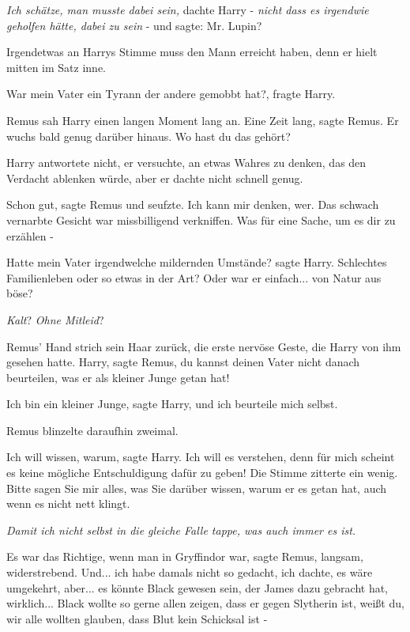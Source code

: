 \emph{Ich schätze, man musste dabei sein,} dachte Harry - \emph{nicht dass es
irgendwie geholfen hätte, dabei zu sein} - und sagte: \glqq{}Mr. Lupin?\grqq{}

Irgendetwas an Harrys Stimme muss den Mann erreicht haben, denn er hielt mitten
im Satz inne.

\glqq{}War mein Vater ein Tyrann der andere gemobbt hat?\grqq{}, fragte Harry.

Remus sah Harry einen langen Moment lang an. \glqq{}Eine Zeit lang\grqq{}, sagte
Remus. \glqq{}Er wuchs bald genug darüber hinaus. Wo hast du das gehört?\grqq{}

Harry antwortete nicht, er versuchte, an etwas Wahres zu denken, das den
Verdacht ablenken würde, aber er dachte nicht schnell genug.

\glqq{}Schon gut\grqq{}, sagte Remus und seufzte. \glqq{}Ich kann mir denken,
wer.\grqq{} Das schwach vernarbte Gesicht war missbilligend verkniffen. \glqq{}Was für
eine Sache, um es dir zu erzählen -\grqq{}

\glqq{}Hatte mein Vater irgendwelche mildernden Umstände?\grqq{} sagte Harry.
\glqq{}Schlechtes Familienleben oder so etwas in der Art? Oder war er einfach...
von Natur aus böse?\grqq{}

\emph{Kalt}? \emph{Ohne Mitleid}?

Remus' Hand strich sein Haar zurück, die erste nervöse Geste, die Harry von ihm
gesehen hatte. \glqq{}Harry\grqq{}, sagte Remus, \glqq{}du kannst deinen Vater
nicht danach beurteilen, was er als kleiner Junge getan hat!\grqq{}

\glqq{}Ich bin ein kleiner Junge\grqq{}, sagte Harry, \glqq{}und ich beurteile
mich selbst.\grqq{}

Remus blinzelte daraufhin zweimal.

\glqq{}Ich will wissen, warum\grqq{}, sagte Harry. \glqq{}Ich will es verstehen,
denn für mich scheint es keine mögliche Entschuldigung dafür zu geben!\grqq{} Die
Stimme zitterte ein wenig. \glqq{}Bitte sagen Sie mir alles, was Sie darüber
wissen, warum er es getan hat, auch wenn es nicht nett klingt.\grqq{}

\emph{Damit ich nicht selbst in die gleiche Falle tappe, was auch immer es ist.}

\glqq{}Es war das Richtige, wenn man in Gryffindor war\grqq{}, sagte Remus,
langsam, widerstrebend. \glqq{}Und... ich habe damals nicht so gedacht, ich
dachte, es wäre umgekehrt, aber... es könnte Black gewesen sein, der James dazu
gebracht hat, wirklich... Black wollte so gerne allen zeigen, dass er gegen
Slytherin ist, weißt du, wir alle wollten glauben, dass Blut kein Schicksal ist
-\grqq{}

